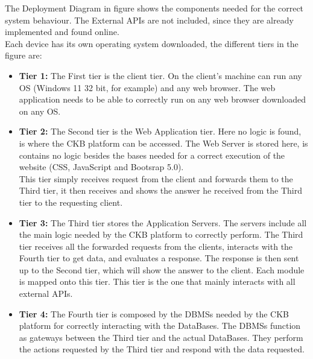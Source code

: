 \documentclass{article}
\begin{document}
{The Deployment Diagram in figure shows the components needed for the correct system behaviour. The External APIs are not included, since they 
are already implemented and found online.\\
Each device has its own operating system downloaded, the different tiers in the figure are:\\
\begin{itemize}
\item \textbf{Tier 1:} The First tier is the client tier. On the client's machine can run any OS (Windows 11 32 bit, for example) and any web browser. The web application
needs to be able to correctly run on any web browser downloaded on any OS.\\
\item \textbf{Tier 2:} The Second tier is the Web Application tier. Here no logic is found, is where the CKB platform can be accessed.
The Web Server is stored here, is contains no logic besides the bases needed for a correct execution of the website (CSS, JavaScript and Bootsrap 5.0). \\
This tier simply receives request from the client and forwards them to the Third tier, it then receives and shows the answer he received from the Third tier
 to the requesting client. \\
 \item \textbf{Tier 3:} The Third tier stores the Application Servers. The servers include all the main logic needed by the CKB platform to correctly perform.
The Third tier receives all the forwarded requests from the clients, interacts with the Fourth tier to get data, and evaluates a response. The response is 
then sent up to the Second tier, which will show the answer to the client. Each module is mapped onto this tier. This tier is the one that mainly interacts
with all external APIs. \\
\item \textbf{Tier 4:} The Fourth tier is composed by the DBMSs needed by the CKB platform for correctly interacting with the DataBases. The DBMSs function as gateways 
between the Third tier and the actual DataBases. They perform the actions requested by the Third tier and respond with the data requested.\\
\end{itemize}
}
\end{document}
